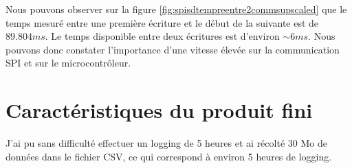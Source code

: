 {	Nous pouvons observer sur la figure \ref{fig:spisdtempreentre2commsupscaled} que le temps mesuré entre une première écriture et le début de la suivante est de $89.804 ms$. Le temps disponible entre deux écritures est d'environ $\sim6ms$.
	Nous pouvons donc constater l'importance d'une vitesse élevée sur la communication SPI et sur le microcontrôleur.
	
	
	
	
	
}

\section{Caractéristiques du produit fini}

J'ai pu sans difficulté effectuer un logging de 5 heures et ai récolté 30 Mo de données dans le fichier CSV, ce qui correspond à environ 5 heures de logging.